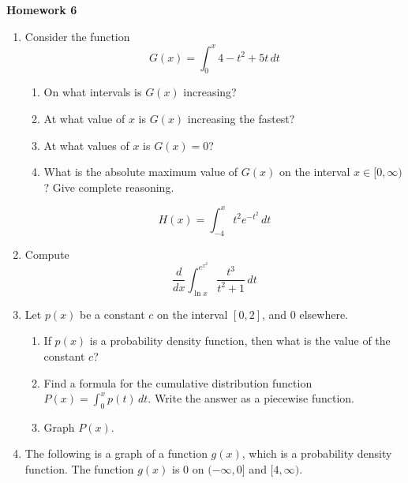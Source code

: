\documentclass{article}
\begin{document}
\begin{center}
    \large \textbf{Homework 6}
\end{center}
                \begin{enumerate}
                    \item Consider the function
                    $$G(x) = \int_0^x 4-t^2+5t\,dt$$
                    \begin{enumerate}
                        \item On what intervals is $G(x)$ increasing?
                        \item At what value of $x$ is $G(x)$ increasing the fastest?
                        \item At what values of $x$ is $G(x)=0$?
                        \item What is the absolute maximum value of $G(x)$ on the interval $x \in [0,\infty)$? Give complete reasoning.
                    \end{enumerate}
                    $$H(x) = \int_{-4}^{x} t^2e^{-t^2}\,dt$$
                    \item Compute
                    $$\frac{d}{dx} \int_{\ln{x}}^{e^{x^2}} \frac{t^3}{t^2+1}\,dt$$
                    \item Let $p(x)$ be a constant $c$ on the interval $[0,2]$, and $0$ elsewhere.
                    \begin{enumerate}
                        \item If $p(x)$ is a probability density function, then what is the value of the constant $c$?
                        \item Find a formula for the cumulative distribution function $\displaystyle P(x)=\int_0^x p(t)\,dt$. Write the answer as a piecewise function. 
                        \item Graph $P(x)$.
                        
                    \end{enumerate}
                \item The following is a graph of a function $g(x)$, which is a probability density function. The function $g(x)$ is $0$ on $(-\infty,0]$ and $[4,\infty)$.
                        \begin{center}
\end{center}
\end{enumerate}
\end{document}
